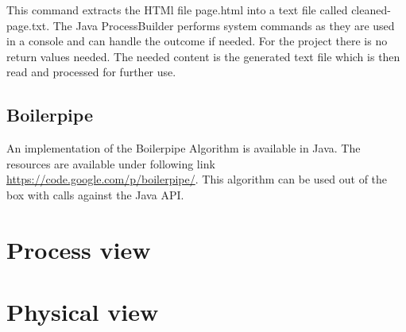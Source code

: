 This command extracts the HTMl file page.html into a text file called cleaned-page.txt. The Java ProcessBuilder performs system commands as they are used in a console and can handle the outcome if needed. For the project there is no return values needed. The needed content is the generated text file which is then read and processed for further use.

\subsection{Boilerpipe}

An implementation of the Boilerpipe Algorithm is available in Java. The resources are available under following link \url{https://code.google.com/p/boilerpipe/}. This algorithm can be used out of the box with calls against the Java API.


\section{Process view}

\section{Physical view}